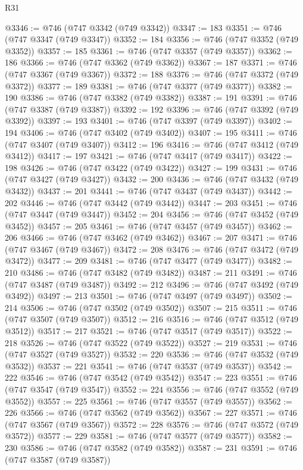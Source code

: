 \begin{lexlean}{R31}
\begin{coremodule}
@3346 := @746 (@747 @3342 (@749 @3342))
@3347 := 183
@3351 := @746 (@747 @3347 (@749 @3347))
@3352 := 184
@3356 := @746 (@747 @3352 (@749 @3352))
@3357 := 185
@3361 := @746 (@747 @3357 (@749 @3357))
@3362 := 186
@3366 := @746 (@747 @3362 (@749 @3362))
@3367 := 187
@3371 := @746 (@747 @3367 (@749 @3367))
@3372 := 188
@3376 := @746 (@747 @3372 (@749 @3372))
@3377 := 189
@3381 := @746 (@747 @3377 (@749 @3377))
@3382 := 190
@3386 := @746 (@747 @3382 (@749 @3382))
@3387 := 191
@3391 := @746 (@747 @3387 (@749 @3387))
@3392 := 192
@3396 := @746 (@747 @3392 (@749 @3392))
@3397 := 193
@3401 := @746 (@747 @3397 (@749 @3397))
@3402 := 194
@3406 := @746 (@747 @3402 (@749 @3402))
@3407 := 195
@3411 := @746 (@747 @3407 (@749 @3407))
@3412 := 196
@3416 := @746 (@747 @3412 (@749 @3412))
@3417 := 197
@3421 := @746 (@747 @3417 (@749 @3417))
@3422 := 198
@3426 := @746 (@747 @3422 (@749 @3422))
@3427 := 199
@3431 := @746 (@747 @3427 (@749 @3427))
@3432 := 200
@3436 := @746 (@747 @3432 (@749 @3432))
@3437 := 201
@3441 := @746 (@747 @3437 (@749 @3437))
@3442 := 202
@3446 := @746 (@747 @3442 (@749 @3442))
@3447 := 203
@3451 := @746 (@747 @3447 (@749 @3447))
@3452 := 204
@3456 := @746 (@747 @3452 (@749 @3452))
@3457 := 205
@3461 := @746 (@747 @3457 (@749 @3457))
@3462 := 206
@3466 := @746 (@747 @3462 (@749 @3462))
@3467 := 207
@3471 := @746 (@747 @3467 (@749 @3467))
@3472 := 208
@3476 := @746 (@747 @3472 (@749 @3472))
@3477 := 209
@3481 := @746 (@747 @3477 (@749 @3477))
@3482 := 210
@3486 := @746 (@747 @3482 (@749 @3482))
@3487 := 211
@3491 := @746 (@747 @3487 (@749 @3487))
@3492 := 212
@3496 := @746 (@747 @3492 (@749 @3492))
@3497 := 213
@3501 := @746 (@747 @3497 (@749 @3497))
@3502 := 214
@3506 := @746 (@747 @3502 (@749 @3502))
@3507 := 215
@3511 := @746 (@747 @3507 (@749 @3507))
@3512 := 216
@3516 := @746 (@747 @3512 (@749 @3512))
@3517 := 217
@3521 := @746 (@747 @3517 (@749 @3517))
@3522 := 218
@3526 := @746 (@747 @3522 (@749 @3522))
@3527 := 219
@3531 := @746 (@747 @3527 (@749 @3527))
@3532 := 220
@3536 := @746 (@747 @3532 (@749 @3532))
@3537 := 221
@3541 := @746 (@747 @3537 (@749 @3537))
@3542 := 222
@3546 := @746 (@747 @3542 (@749 @3542))
@3547 := 223
@3551 := @746 (@747 @3547 (@749 @3547))
@3552 := 224
@3556 := @746 (@747 @3552 (@749 @3552))
@3557 := 225
@3561 := @746 (@747 @3557 (@749 @3557))
@3562 := 226
@3566 := @746 (@747 @3562 (@749 @3562))
@3567 := 227
@3571 := @746 (@747 @3567 (@749 @3567))
@3572 := 228
@3576 := @746 (@747 @3572 (@749 @3572))
@3577 := 229
@3581 := @746 (@747 @3577 (@749 @3577))
@3582 := 230
@3586 := @746 (@747 @3582 (@749 @3582))
@3587 := 231
@3591 := @746 (@747 @3587 (@749 @3587))

\end{coremodule}
\end{lexlean}
